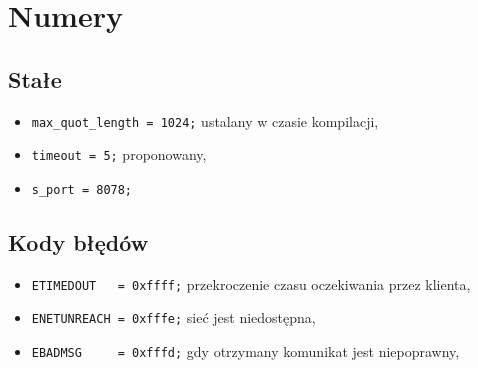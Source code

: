\documentclass{article}
\begin{document}
\section{Numery}
\subsection{Stałe}
\begin{itemize}
\item \verb+max_quot_length = 1024;+ ustalany w czasie kompilacji,
\item \verb+timeout = 5;+ proponowany,
\item \verb+s_port = 8078;+
\end{itemize}
\subsection{Kody błędów}
\begin{itemize}
\item \verb+ETIMEDOUT   = 0xffff;+ przekroczenie czasu oczekiwania przez klienta,
\item \verb+ENETUNREACH = 0xfffe;+ sieć jest niedostępna,
\item \verb+EBADMSG     = 0xfffd;+ gdy otrzymany komunikat jest niepoprawny,
\end{itemize}
\end{document}

